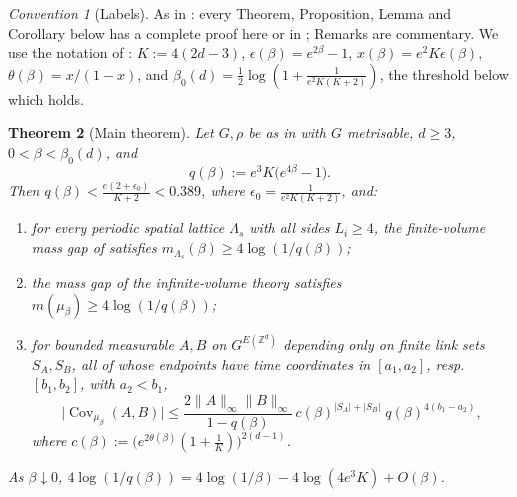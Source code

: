 \documentclass[11pt,a4paper]{article}
\newtheorem{theorem}{Theorem}[section]
\theoremstyle{definition}
\theoremstyle{remark}
\newtheorem{convention}[theorem]{Convention}
\DeclareMathOperator{\Cov}{Cov}
\newcommand{\Z}{\mathbb{Z}}
\newcommand{\norm}[1]{\lVert #1\rVert}
\newcommand{\Fref}[3]{\cite[#1~`#2' (\texttt{#3})]{F}}
\newcommand{\Fname}[2]{\cite[#1~`#2']{F}}
\newcommand{\IIref}[3]{\cite[#1~`#2' (\texttt{#3})]{II}}
\begin{document}
\begin{convention}[Labels]
As in \Fname{Convention}{Labels}: every Theorem, Proposition, Lemma and Corollary below has a complete proof here or in
\cite{F,II,III}; Remarks are commentary. We use the notation of \cite{III}: $K:=4(2d-3)$,
$\epsilon(\beta)=e^{2\beta}-1$, $x(\beta)=e^2K\epsilon(\beta)$, $\theta(\beta)=x/(1-x)$, and
$\beta_0(d)=\frac12\log(1+\frac1{e^2K(K+2)})$, the threshold below which \Fref{Theorem}{Convergence of the
strong-coupling cluster expansion}{thm:conv} holds.
\end{convention}

\begin{theorem}[Main theorem]\label{mg:thm:main}
Let $G,\rho$ be as in \Fname{Convention}{Group} with $G$ metrisable, $d\ge3$, $0<\beta<\beta_0(d)$, and
\[
q(\beta):=e^3K\bigl(e^{4\beta}-1\bigr).
\]
Then $q(\beta)<\frac{e(2+\epsilon_0)}{K+2}<0.389$, where $\epsilon_0=\frac1{e^2K(K+2)}$, and:
\begin{enumerate}[label=(\roman*)]
\item for every periodic spatial lattice $\Lambda_s$ with all sides $L_i\ge4$, the finite-volume mass gap of
\Fref{Definition}{Hamiltonian and mass gap}{def:H} satisfies $m_{\Lambda_s}(\beta)\ge4\log(1/q(\beta))$;
\item the mass gap of the infinite-volume theory \IIref{Definition}{Mass gap of an infinite-volume lattice theory}{iv:def:gap}
satisfies $m(\mu_\beta)\ge4\log(1/q(\beta))$;
\item for bounded measurable $A,B$ on $G^{E(\Z^d)}$ depending only on finite link sets $S_A,S_B$, all of whose
endpoints have time coordinates in $[a_1,a_2]$, resp.\ $[b_1,b_2]$, with $a_2<b_1$,
\[
\bigl|\Cov_{\mu_\beta}(A,B)\bigr|\le\frac{2\norm A_\infty\norm B_\infty}{1-q(\beta)}\,
c(\beta)^{|S_A|+|S_B|}\;q(\beta)^{4(b_1-a_2)},
\]
where $c(\beta):=\bigl(e^{2\theta(\beta)}(1+\frac1K)\bigr)^{2(d-1)}$.
\end{enumerate}
As $\beta\downarrow0$, $4\log(1/q(\beta))=4\log(1/\beta)-4\log(4e^3K)+O(\beta)$.
\end{theorem}
\end{document}

